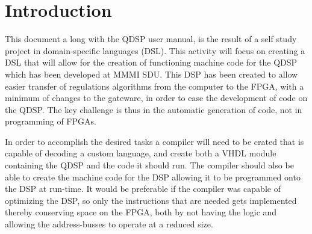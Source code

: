 \chapter{Introduction}
This document a long with the QDSP user manual, is the result of a self study project in domain-specific languages (DSL). This activity will focus on creating a DSL that will allow for the creation of functioning machine code for the QDSP which has been developed at MMMI SDU. This DSP has been created to allow easier transfer of regulations algorithms from the computer to the FPGA, with a minimum of changes to the gateware, in order to ease the development of code on the QDSP. The key challenge is thus in the automatic generation of code, not in programming of FPGAs.

In order to accomplish the desired tasks a compiler will need to be crated that is capable of decoding a custom language, and create both a VHDL module containing the QDSP and the code it should run. The compiler should also be able to create the machine code for the DSP allowing it to be programmed onto the DSP at run-time. It would be preferable if the compiler was capable of optimizing the DSP, so only the instructions that are needed gets implemented thereby conserving space on the FPGA, both by not having the logic and allowing the address-busses to operate at a reduced size.
